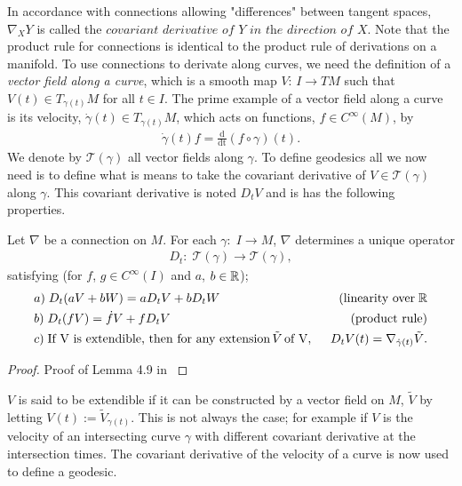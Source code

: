 In accordance with connections allowing "differences" between tangent spaces, $ \nabla_X Y $ is called the $\textit{covariant derivative of Y in the direction of X}$. Note that the product rule for connections is identical to the product rule of derivations on a manifold. To use connections to derivate along curves, we need the definition of a \textit{vector field along a curve}, which is a smooth map $V: \, I \rightarrow TM$ such that $V(t) \in T_{\gamma(t)} M$ for all $t \in I$. The prime example of a vector field along a curve is its velocity, $\dot{\gamma}(t) \in T_{\gamma(t)} M$, which acts on functions, $f \in C^\infty(M)$, by
\begin{align*}
\dot{\gamma}(t) f = \frac{\text{d}}{\text{dt}} (f \circ \gamma)(t).
\end{align*}
We denote by $\mathcal{T}(\gamma)$ all vector fields along $\gamma$.
To define geodesics all we now need is to define what is means to take the covariant derivative of $V \in \mathcal{T}(\gamma)$ along $\gamma$. This covariant derivative is noted $D_t V$ and is has the following properties.

\begin{lemma}
Let $\nabla$ be a connection on $M$. For each $\gamma: \; I \rightarrow M$, $\nabla$ determines a unique operator
\begin{align*}
D_t: \; \mathcal{T}(\gamma) \rightarrow \mathcal{T}(\gamma),
\end{align*}
satisfying (for $f$, $g \in C^\infty(I)$ and $a$, $b \in \mathbb{R}$);
\begin{align*}
& a) \; D_t(aV + bW) = aD_tV + bD_tW & \text{(linearity over} \; \mathbb{R} \\
& b) \; D_t(fV) = \dot{f}V + fD_tV & \text{(product rule)} \\
& c) \; \text{If V is extendible, then for any extension} \, \tilde{V} \, \text{of V}, \; \; & D_tV(t) = \nabla_{\dot{\gamma}(t)} \tilde{V}.
\end{align*}
\end{lemma}
\begin{proof}
Proof of Lemma 4.9 in \cite{lee2006riemannian}
\end{proof}

$V$ is said to be extendible if it can be constructed by a vector field on $M$, $\tilde{V}$ by letting $V(t) := \tilde{V}_{\gamma(t)}$. This is not always the case; for example if $V$ is the velocity of an intersecting curve $\gamma$ with different covariant derivative at the intersection times. The covariant derivative of the velocity of a curve is now used to define a geodesic.

